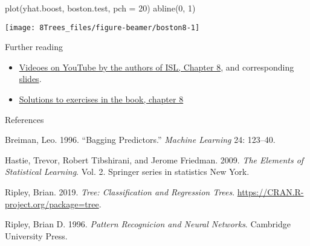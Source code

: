 \documentclass[
  10pt,
  ignorenonframetext,
]{beamer}
\newenvironment{Shaded}{\begin{snugshade}}{\end{snugshade}}
\newcommand{\AttributeTok}[1]{\textcolor[rgb]{0.77,0.63,0.00}{#1}}
\newcommand{\DecValTok}[1]{\textcolor[rgb]{0.00,0.00,0.81}{#1}}
\newcommand{\FunctionTok}[1]{\textcolor[rgb]{0.00,0.00,0.00}{#1}}
\newcommand{\NormalTok}[1]{#1}
\newlength{\cslhangindent}
\newlength{\cslentryspacingunit} %
\newenvironment{CSLReferences}[2] %
 {%
  \setlength{\parindent}{0pt}
  \ifodd #1
  \let\oldpar\par
  \def\par{\hangindent=\cslhangindent\oldpar}
  \fi
  \setlength{\parskip}{#2\cslentryspacingunit}
 }%
 {}
\begin{document}
\begin{frame}[fragile]
\scriptsize

\begin{Shaded}
\begin{Highlighting}[]
\FunctionTok{plot}\NormalTok{(yhat.boost, boston.test, }\AttributeTok{pch =} \DecValTok{20}\NormalTok{)}
\FunctionTok{abline}\NormalTok{(}\DecValTok{0}\NormalTok{, }\DecValTok{1}\NormalTok{)}
\end{Highlighting}
\end{Shaded}

\begin{center}\texttt{[image: 8Trees\_files/figure-beamer/boston8-1]} \end{center}
\end{frame}

\begin{frame}{Further reading}
\protect\hypertarget{further-reading}{}
\begin{itemize}
\item
  \href{https://www.youtube.com/playlist?list=PL5-da3qGB5IB23TLuA8ZgVGC8hV8ZAdGh}{Videoes
  on YouTube by the authors of ISL, Chapter 8}, and corresponding
  \href{https://lagunita.stanford.edu/c4x/HumanitiesScience/StatLearning/asset/trees.pdf}{slides}.
\item
  \href{https://rstudio-pubs-static.s3.amazonaws.com/65564_925dfde884e14ef9b5735eddd16c263e.html}{Solutions
  to exercises in the book, chapter 8}
\end{itemize}
\end{frame}

\begin{frame}{References}
\protect\hypertarget{references}{}
\tiny

\hypertarget{refs}{}
\begin{CSLReferences}{1}{0}
\leavevmode{}%
Breiman, Leo. 1996. {``Bagging Predictors.''} \emph{Machine Learning}
24: 123--40.

\leavevmode{}%
Hastie, Trevor, Robert Tibshirani, and Jerome Friedman. 2009. \emph{The
Elements of Statistical Learning}. Vol. 2. Springer series in statistics
New York.

\leavevmode{}%
Ripley, Brian. 2019. \emph{Tree: Classification and Regression Trees}.
\url{https://CRAN.R-project.org/package=tree}.

\leavevmode{}%
Ripley, Brian D. 1996. \emph{Pattern Recognicion and Neural Networks}.
Cambridge University Press.

\end{CSLReferences}
\end{frame}
\end{document}
